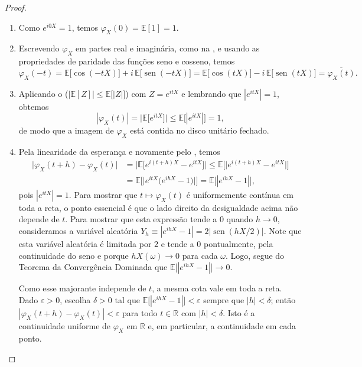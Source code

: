 \documentclass[12pt,portuguese]{article}
\theoremstyle{definition}
\theoremstyle{plainexercise}
\theoremstyle{starredexercise}
\theoremstyle{definition}
\renewcommand{\sin}{\operatorname{sen}}
\begin{document}
\begin{proof}

\begin{enumerate}[label=(\alph*)]
\item Como $e^{i0X}=1$, temos $\varphi_X(0)=\mathbb{E}[1]=1$. 

\item Escrevendo $\varphi_X$ em partes real e imaginária, como na
, e usando as propriedades de paridade das funções seno e cosseno, temos
\[
\varphi_X(-t)=\mathbb{E}\bigl[\cos(-tX)\bigr]+i\,\mathbb{E}\bigl[\sin(-tX)\bigr]
=\mathbb{E}\bigl[\cos(tX)\bigr]-i\,\mathbb{E}\bigl[\sin(tX)\bigr]
=\overline{\varphi_X(t)}.
\]

\item Aplicando o  ($|\mathbb{E}[Z]|\leqslant\mathbb{E}\bigl[|Z|\bigr]$)
com $Z=e^{itX}$ e lembrando que $|e^{itX}|=1$, obtemos
\[
|\varphi_X(t)|=\bigl|\mathbb{E}\bigl[e^{itX}\bigr]\bigr|
\leqslant\mathbb{E}\bigl[|e^{itX}|\bigr]=1,
\]
de modo que a imagem de $\varphi_X$ está contida no disco unitário fechado.

\item Pela linearidade da esperança e novamente pelo , temos
\[
\begin{aligned}
\bigl|\varphi_X(t+h)-\varphi_X(t)\bigr|
&=\bigl|\mathbb{E}\bigl[e^{i(t+h)X}-e^{itX}\bigr]\bigr|
\leqslant\mathbb{E}\bigl[\bigl|e^{i(t+h)X}-e^{itX}\bigr|\bigr]
\\[0.3cm]
&=\mathbb{E}\bigl[\bigl|e^{itX}\bigl(e^{ihX}-1\bigr)\bigr|\bigr]
=\mathbb{E}\bigl[|e^{ihX}-1|\bigr],
\end{aligned}
\]
pois $|e^{itX}|=1$. Para mostrar que $t\longmapsto \varphi_{X}(t)$ é uniformemente 
contínua em toda a reta, o ponto essencial é que o lado direito da desigualdade acima não depende de $t$.
Para mostrar que esta expressão tende a $0$ quando $h\to0$, consideramos a variável aleatória
$Y_h\equiv|e^{ihX}-1|=2\bigl|\sin(hX/2)\bigr|$. Note que esta variável aleatória
é limitada por $2$ e tende a $0$ pontualmente, pela continuidade do seno e porque $hX(\omega)\to0$ para cada
$\omega$. Logo, segue do Teorema da Convergência Dominada que $\mathbb{E}\bigl[|e^{ihX}-1|\bigr]\to0$.

Como esse majorante independe de $t$, a mesma cota vale em toda a reta. Dado
$\varepsilon>0$, escolha $\delta>0$ tal que
$\mathbb{E}\bigl[|e^{ihX}-1|\bigr]<\varepsilon$ sempre que $|h|<\delta$; então
$|\varphi_X(t+h)-\varphi_X(t)|<\varepsilon$ para todo $t\in\mathbb{R}$ com
$|h|<\delta$. Isto é a continuidade uniforme de $\varphi_X$ em $\mathbb{R}$ e, em
particular, a continuidade em cada ponto.


\end{enumerate}
\end{proof}
\end{document}
